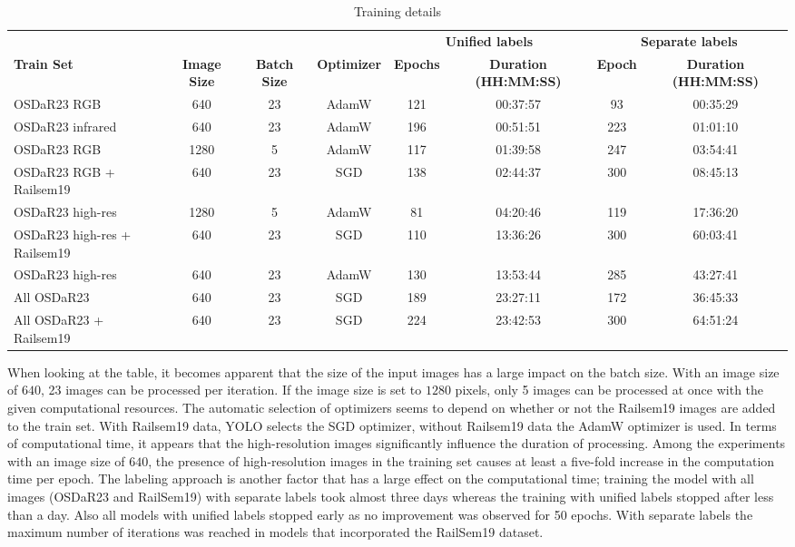 \documentclass[Master,MDS,english]{BASE/twbook} %
\begin{document}
 
\begin{table}[htbp]
    \centering
    \tiny
    \begin{tabular}{|l|c|c|c|c|c|c|c|}
    \hline
    &  &  & & \multicolumn{2}{c|}{\textbf{Unified labels}}   & \multicolumn{2}{c|}{\textbf{Separate labels}}   \\ \cline{5-8}
    \textbf{Train Set} & \textbf{Image Size} & \textbf{Batch Size} & \textbf{Optimizer} & \textbf{Epochs} & \textbf{Duration (HH:MM:SS)} & \textbf{Epoch} & \textbf{Duration (HH:MM:SS)} \\
    \hline
    OSDaR23 RGB & 640 & 23 & AdamW & 121 & 00:37:57 & 93 & 00:35:29 \\
    OSDaR23 infrared & 640 & 23 & AdamW & 196 & 00:51:51 & 223 & 01:01:10 \\
    OSDaR23 RGB & 1280 & 5 & AdamW & 117 & 01:39:58 & 247 & 03:54:41 \\
    OSDaR23 RGB + Railsem19 & 640 & 23 & SGD & 138 & 02:44:37 & 300 & 08:45:13 \\
    OSDaR23 high-res & 1280 & 5 & AdamW & 81 & 04:20:46 & 119 & 17:36:20 \\
    OSDaR23 high-res + Railsem19 & 640 & 23 & SGD & 110 & 13:36:26 & 300 & 60:03:41 \\
    OSDaR23 high-res & 640 & 23 & AdamW & 130 & 13:53:44 & 285 & 43:27:41 \\
    All OSDaR23 & 640 & 23 & SGD & 189 & 23:27:11 & 172 & 36:45:33 \\
    All OSDaR23 + Railsem19 & 640 & 23 & SGD & 224 & 23:42:53 & 300 & 64:51:24 \\
    \hline
    \end{tabular}
    \caption{Training details}
    \label{tab:training}
\end{table}
 
When looking at the table, it becomes apparent that the size of the input images has a large impact on the batch size. With an image size of $640$, 23 images can be processed per iteration. If the image size is set to $1280$ pixels, only 5 images can be processed at once with the given computational resources. The automatic selection of optimizers seems to depend on whether or not the Railsem19 images are added to the train set. With Railsem19 data, YOLO selects the SGD optimizer, without Railsem19 data the AdamW optimizer is used.   
In terms of computational time, it appears that the high-resolution images significantly influence the duration of processing. Among the experiments with an image size of $640$, the presence of high-resolution images in the training set causes at least a five-fold increase in the computation time per epoch. The labeling approach is another factor that has a large effect on the computational time; training the model with all images (OSDaR23 and RailSem19) with separate labels took almost three days whereas the training with unified labels stopped after less than a day.
Also all models with unified labels stopped early as no improvement was observed for 50 epochs. With separate labels  the maximum number of iterations was reached in models that incorporated the RailSem19 dataset. 
\end{document}
